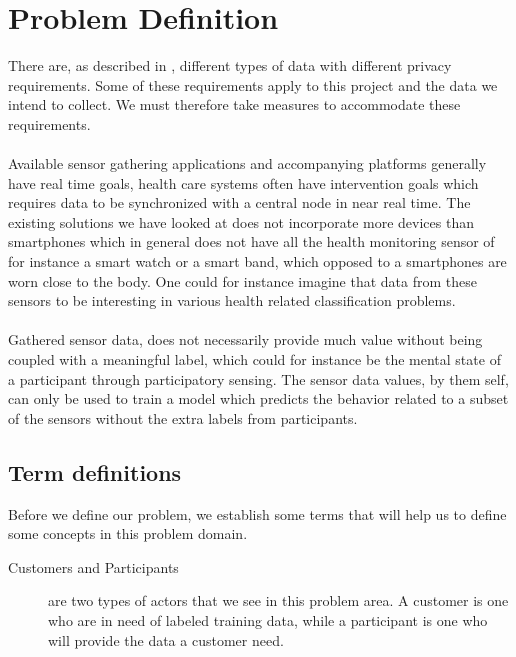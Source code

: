 
\section{Problem Definition} 
\label{sec:problem_definition}
There are, as described in , different types of data with different privacy requirements. Some of these requirements apply to this project and the data we intend to collect. We must therefore take measures to accommodate these requirements.
\\\\
Available sensor gathering applications and accompanying platforms generally have real time goals, health care systems often have intervention goals which requires data to be synchronized with a central node in near real time. The existing solutions we have looked at does not incorporate more devices than smartphones which in general does not have all the health monitoring sensor of for instance a smart watch or a smart band, which opposed to a smartphones are worn close to the body. One could for instance imagine that data from these sensors to be interesting in various health related classification problems. 
\\\\
Gathered sensor data, does not necessarily provide much value without being coupled with a meaningful label, which could for instance be the mental state of a participant through participatory sensing. The sensor data values, by them self, can only be used to train a model which predicts the behavior related to a subset of the sensors without the extra labels from participants. 

\subsection{Term definitions}
Before we define our problem, we establish some terms that will help us to define some concepts in this problem domain. 

\begin{description}
    \item [Customers and Participants] are two types of actors that we see in this problem area. A customer is one who are in need of labeled training data, while a participant is one who will provide the data a customer need. 
\end{description}


